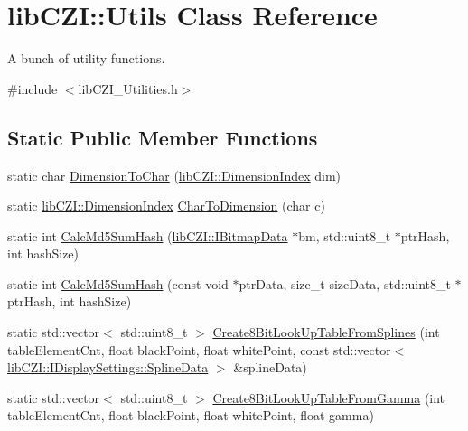 \hypertarget{classlib_c_z_i_1_1_utils}{}\section{lib\+C\+ZI\+:\+:Utils Class Reference}
\label{classlib_c_z_i_1_1_utils}


A bunch of utility functions.  




{\ttfamily \#include $<$lib\+C\+Z\+I\+\_\+\+Utilities.\+h$>$}

\subsection*{Static Public Member Functions}
\begin{DoxyCompactItemize}
\item 
static char \hyperlink{classlib_c_z_i_1_1_utils_ae97a98f63029f18282b1c940a79518a4}{Dimension\+To\+Char} (\hyperlink{namespacelib_c_z_i_a55049658acf59d0eddfaebcad16df424}{lib\+C\+Z\+I\+::\+Dimension\+Index} dim)
\item 
static \hyperlink{namespacelib_c_z_i_a55049658acf59d0eddfaebcad16df424}{lib\+C\+Z\+I\+::\+Dimension\+Index} \hyperlink{classlib_c_z_i_1_1_utils_acc8b44f500d3e3cda3dea381acca485a}{Char\+To\+Dimension} (char c)
\item 
static int \hyperlink{classlib_c_z_i_1_1_utils_a1718a9b6cf313114b8c70fd78befcf0a}{Calc\+Md5\+Sum\+Hash} (\hyperlink{classlib_c_z_i_1_1_i_bitmap_data}{lib\+C\+Z\+I\+::\+I\+Bitmap\+Data} $\ast$bm, std\+::uint8\+\_\+t $\ast$ptr\+Hash, int hash\+Size)
\item 
static int \hyperlink{classlib_c_z_i_1_1_utils_ae31970caf0590b90fb85d4ff4a88cf1a}{Calc\+Md5\+Sum\+Hash} (const void $\ast$ptr\+Data, size\+\_\+t size\+Data, std\+::uint8\+\_\+t $\ast$ptr\+Hash, int hash\+Size)
\item 
static std\+::vector$<$ std\+::uint8\+\_\+t $>$ \hyperlink{classlib_c_z_i_1_1_utils_a4602857b1d21eb75a0c7740a21297791}{Create8\+Bit\+Look\+Up\+Table\+From\+Splines} (int table\+Element\+Cnt, float black\+Point, float white\+Point, const std\+::vector$<$ \hyperlink{structlib_c_z_i_1_1_i_display_settings_1_1_spline_data}{lib\+C\+Z\+I\+::\+I\+Display\+Settings\+::\+Spline\+Data} $>$ \&spline\+Data)
\item 
static std\+::vector$<$ std\+::uint8\+\_\+t $>$ \hyperlink{classlib_c_z_i_1_1_utils_a3814604760096f9d0bb6f292de4fdf5f}{Create8\+Bit\+Look\+Up\+Table\+From\+Gamma} (int table\+Element\+Cnt, float black\+Point, float white\+Point, float gamma)

\end{DoxyCompactItemize}
